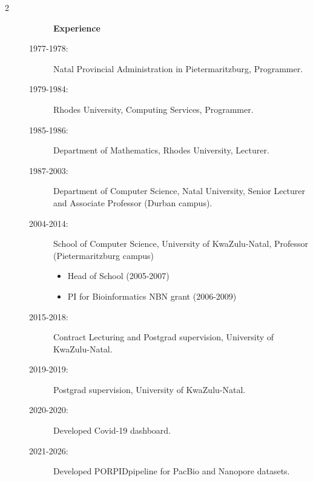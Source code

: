 \documentclass[12pt]{article}
\begin{document}
\begin{multicols}{2}
\begin{description}
\item[] \begin{description}
\item[] {\large \bf Experience}
\item[1977-1978:]
Natal Provincial Administration in Pietermaritzburg, Programmer. 
\item[1979-1984:]
Rhodes University, Computing Services, Programmer.  
\item[1985-1986:]
Department of Mathematics, Rhodes University, Lecturer. 
\item[1987-2003:]
Department of Computer Science, Natal University, \newline
Senior Lecturer and Associate Professor (Durban campus). 
\item[2004-2014:]
School of Computer Science, University of KwaZulu-Natal,  \newline
Professor (Pietermaritzburg campus)
\begin{itemize}
\item  Head of School (2005-2007)
\item  PI for Bioinformatics NBN grant (2006-2009)
\end{itemize}
\item[2015-2018:]
Contract Lecturing and Postgrad supervision, University of KwaZulu-Natal.
\item[2019-2019:]
Postgrad supervision, University of KwaZulu-Natal.
\item[2020-2020:]
Developed Covid-19 dashboard.
\item[2021-2026:]
Developed PORPIDpipeline for PacBio and Nanopore datasets.
\end{description}
\end{description}

\end{multicols}
\end{document}
